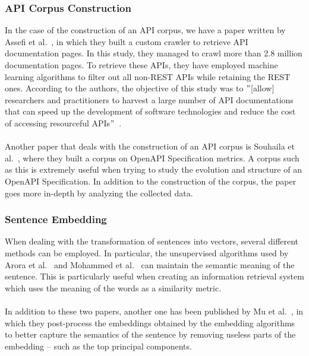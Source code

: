 \subsubsection{API Corpus Construction}
In the case of the construction of an API corpus, we have a paper written by Assefi et al.~\cite{assefi_intelligent_2022}, in which they built a custom crawler to retrieve API documentation pages.
In this study, they managed to crawl more than 2.8 million documentation pages.
To retrieve these APIs, they have employed machine learning algorithms to filter out all non-REST APIs while retaining the REST ones.
According to the authors, the objective of this study was to \("\)[allow] researchers and practitioners to harvest a large number of API documentations that can speed up the development of software technologies and reduce the cost of accessing resourceful APIs\("\)~\cite{assefi_intelligent_2022}. \\ \\
Another paper that deals with the construction of an API corpus is Souhaila et al.~\cite{souhaila_serbout_apistic_2024}, where they built a corpus on OpenAPI Specification metrics.
A corpus such as this is extremely useful when trying to study the evolution and structure of an OpenAPI Specification.
In addition to the construction of the corpus, the paper goes more in-depth by analyzing the collected data.

\subsubsection{Sentence Embedding}
When dealing with the transformation of sentences into vectors, several different methods can be employed.
In particular, the unsupervised algorithms used by Arora et al.~\cite{arora_simple_2019} and Mohammed et al.~\cite{mohammed_state---art_2021} can maintain the semantic meaning of the sentence.
This is particularly useful when creating an information retrieval system which uses the meaning of the words as a similarity metric. \\ \\
In addition to these two papers, another one has been published by Mu et al.~\cite{mu_all-but--top_2018}, in which they post-process the embeddings obtained by the embedding algorithms to better capture the semantics of the sentence by removing useless parts of the embedding -- such as the top principal components.

